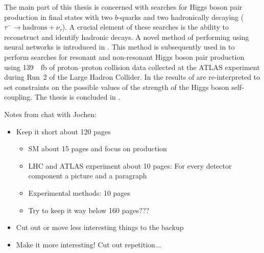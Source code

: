 The main part of this thesis is concerned with searches for Higgs boson pair
production in final states with two $b$-quarks and two hadronically decaying
\tauleptons ($\tau^{-} \to \text{hadrons} + \nu_\tau$). A crucial element of
these searches is the ability to reconstruct and identify hadronic \taulepton
decays. A novel method of performing \tauid using neural networks is
introduced in . This method is subsequently used in
 to perform searches for resonant and non-resonant Higgs boson
pair production using \SI{139}{\per\femto\barn} of proton--proton collision data
collected at the ATLAS experiment during Run~2 of the Large Hadron Collider. In
 the results of  are
re-interpreted to set constraints on the possible values of the strength of the
Higgs boson self-coupling. The thesis is concluded in .

\clearpage



Notes from chat with Jochen:
\begin{itemize}

\item Keep it short \ra about 120 pages
  \begin{itemize}
  \item SM about 15 pages and focus on \HH production

  \item LHC and ATLAS experiment about 10 pages: For every detector
    component a picture and a paragraph

  \item Experimental methods: 10 pages

  \item Try to keep it way below 160 pages???
  \end{itemize}

\item Cut out or move less interesting things to the backup

\item Make it more interesting! Cut out repetition...

\end{itemize}


